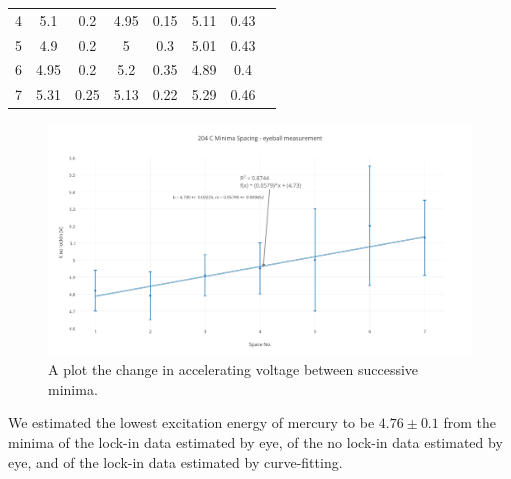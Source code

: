 \documentclass[prb,preprint]{revtex4-1}
\begin{document}
\begin{table}[h!]
\begin{ruledtabular}
\begin{tabular}{cccccccl}
4         & 5.1                                          & 0.2                                         & 4.95                                             & 0.15                                            & 5.11                                           & 0.43                                           \\
5         & 4.9                                          & 0.2                                         & 5                                                & 0.3                                             & 5.01                                           & 0.43                                           \\
6         & 4.95                                         & 0.2                                         & 5.2                                              & 0.35                                            & 4.89                                           & 0.4                                            \\
7         & 5.31                                         & 0.25                                        & 5.13                                             & 0.22                                            & 5.29                                           & 0.46                                          
\end{tabular}
\end{ruledtabular}
\label{minimaSpacing}
\end{table}

\begin{figure}[h!]
\centering
\includegraphics[width=6in]{204C_minima_eyeball.pdf}
\caption{A plot the change in accelerating voltage between successive minima.}
\label{nomineye}
\end{figure}


We estimated the lowest excitation energy of mercury to be $4.76\pm0.1$ from the minima of the lock-in data estimated by eye, of the no lock-in data estimated by eye, and of the lock-in data estimated by curve-fitting.
\end{document}
